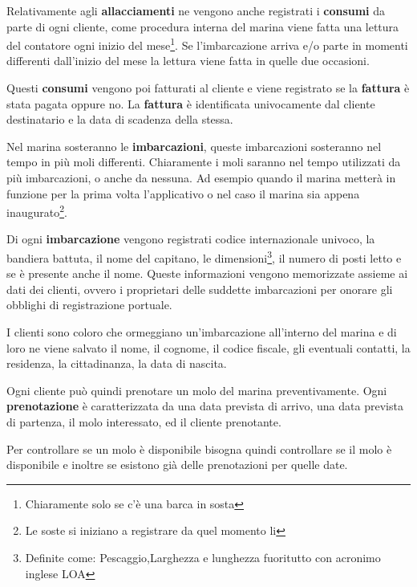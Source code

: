Relativamente agli \textbf{allacciamenti} ne vengono anche registrati i \textbf{consumi} da parte di ogni cliente, come procedura interna del marina viene fatta una lettura del contatore ogni inizio del mese\footnote{Chiaramente solo se c'è una barca in sosta}. Se l'imbarcazione arriva e/o parte in momenti differenti dall'inizio del mese la lettura viene fatta in quelle due occasioni.

Questi \textbf{consumi} vengono poi fatturati al cliente e viene registrato se la \textbf{fattura} è stata pagata oppure no.
La \textbf{fattura} è identificata univocamente dal cliente destinatario e la data di scadenza della stessa.





Nel marina sosteranno le \textbf{imbarcazioni}, queste imbarcazioni sosteranno nel tempo in più moli differenti. Chiaramente i moli saranno nel tempo utilizzati da più imbarcazioni, o anche da nessuna. Ad esempio quando il marina metterà in funzione per la prima volta l'applicativo o nel caso il marina sia appena inaugurato\footnote{Le soste si iniziano a registrare da quel momento li}.

Di ogni \textbf{imbarcazione} vengono registrati codice internazionale univoco, la bandiera battuta, il nome del capitano, le dimensioni\footnote{Definite come: Pescaggio,Larghezza e lunghezza fuoritutto con acronimo inglese LOA}, il numero di posti letto e se è presente anche il nome. Queste informazioni vengono memorizzate assieme ai dati dei clienti, ovvero i proprietari delle suddette imbarcazioni per onorare gli obblighi di registrazione portuale.

I clienti sono coloro che ormeggiano un'imbarcazione all'interno del marina e di loro ne viene salvato il nome, il cognome, il codice fiscale, gli eventuali contatti, la residenza, la cittadinanza, la data di nascita.

Ogni cliente può quindi prenotare un molo del marina preventivamente. Ogni \textbf{prenotazione} è caratterizzata da una data prevista di arrivo, una data prevista di partenza, il molo interessato, ed il cliente prenotante.

Per controllare se un molo è disponibile bisogna quindi controllare se il molo è disponibile e inoltre se esistono già delle prenotazioni per quelle date.

